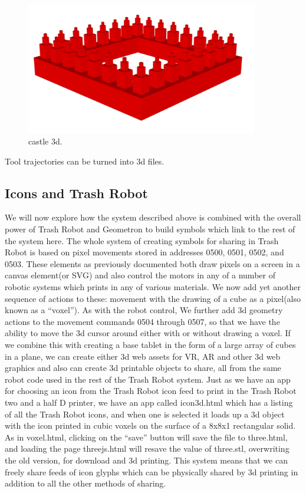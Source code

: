 \begin{figure}
	\centering
	\includegraphics[width=4in]{figures/geometron3d/whimsycastle.png}
	\caption[whimsycastle]
	{castle 3d.}
\end{figure}


Tool trajectories can be turned into 3d files.

\subsection{Icons and Trash Robot}

We will now explore how the system described above is combined with the overall power of Trash Robot and Geometron to build symbols which link to the rest of the system here.  The whole system of creating symbols for sharing in Trash Robot is based on pixel movements stored in addresses 0500, 0501, 0502, and 0503.  These elements as previously documented both draw pixels on a screen in a canvas element(or SVG) and also control the motors in any of a number of robotic systems which prints in any of various materials.  We now add yet another sequence of actions to these: movement with the drawing of a cube as a pixel(also known as a ``voxel'').  As with the robot control, We further add 3d geometry actions to the movement commands 0504 through 0507, so that we have the ability to move the 3d cursor around either with or without drawing a voxel.  If we combine this with creating a base tablet in the form of a large array of cubes in a plane, we can create either 3d web assets for VR, AR and other 3d web graphics and also can create 3d printable objects to share, all from the same robot code used in the rest of the Trash Robot system.  Just as we have an app for choosing an icon from the Trash Robot icon feed to print in the Trash Robot two and a half D printer, we have an app called icon3d.html which has a listing of all the Trash Robot icons, and when one is selected it loads up a 3d object with the icon printed in cubic voxels on the surface of a 8x8x1 rectangular solid.  As in voxel.html, clicking on the ``save'' button will  save the file to three.html, and loading the page threejs.html will resave the value of three.stl, overwriting the old version, for download and 3d printing.  This system means that we can freely share feeds of icon glyphs which can be physically shared by 3d printing in addition to all the other methods of sharing.  

